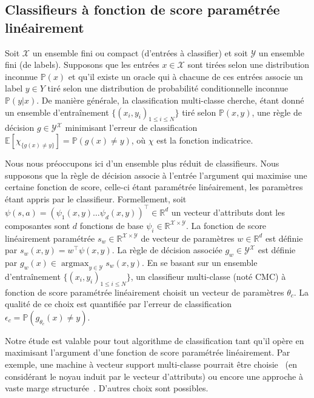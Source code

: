 \documentclass[english,utf8]{./hermes-journal}
\newcommand{\argmax}{\operatorname*{argmax}} %
\newcommand{\X}{\mathcal{X}}
\newcommand{\Y}{\mathcal{Y}}
\newcommand{\E}{\mathbb{E}}
\newcommand{\prob}{\mathbb{P}}
\begin{document}
\subsection{Classifieurs à fonction de score paramétrée linéairement} \label{subsec:background:classif}

Soit $\X$ un ensemble fini ou compact (d'entrées à classifier)
 et soit $\Y$ un ensemble fini (de labels). Supposons que les entrées $x\in
\X$ sont tirées selon une distribution inconnue $\prob(x)$ et qu'il existe un oracle qui à chacune de ces entrées associe un label $y\in Y$ tiré selon une distribution de probabilité conditionnelle inconnue $\prob(y|x)$. De manière générale, la classification multi-classe cherche, étant donné un ensemble d'entraînement $\{(x_i,y_i)_{1\leq i \leq N}\}$ tiré selon $\prob(x,y)$, une règle de décision $g\in\Y^\X$ minimisant l'erreur de classification $\E[\chi_{\{g(x)\neq y\}}] = \prob(g(x)\neq y)$, où $\chi$ est la fonction indicatrice.

Nous nous préoccupons ici d'un ensemble plus réduit de classifieurs. Nous supposons que la règle de décision associe à l'entrée l'argument qui maximise une certaine fonction de score, celle-ci étant paramétrée linéairement, les paramètres étant appris par le classifieur. Formellement, soit $\psi(s,a) =
(\psi_1(x,y)  \dots  \psi_d(x,y))^\top\in \mathbb{R}^d$
un vecteur d'attributs dont les composantes sont $d$ fonctions de base $\psi_i\in\mathbb{R}^{\X\times\Y}$. La fonction de score linéairement paramétrée $s_w\in\mathbb{R}^{\X\times \Y}$ de vecteur de paramètres $w\in\mathbb{R}^d$ est définie par $s_w(x,y) = w^\top \psi(x,y)$. La règle de décision associée $g_w\in{\Y^\X}$ est définie par $g_w(x) \in \argmax_{y\in\Y}s_w(x,y)$. En se basant sur un ensemble d'entraînement $\{(x_i,y_i)_{1\leq
i\leq N}\}$, un classifieur multi-classe (noté CMC) à fonction de score paramétrée linéairement choisit un vecteur de paramètres $\theta_c$. La qualité de ce choix est quantifiée par l'erreur de classification $\epsilon_c =
\prob(g_{\theta_c}(x)\neq y)$. %

Notre étude est valable pour tout algorithme de classification tant qu'il opère en maximisant l'argument d'une fonction de score paramétrée linéairement. Par exemple, une machine à vecteur support multi-classe pourrait être choisie~\cite{Guermeur:2007} (en considérant le noyau induit par le vecteur d'attributs) ou encore une approche à vaste marge structurée~\cite{Taskar:2005}. D'autres choix sont possibles.
\end{document}
